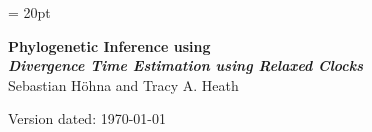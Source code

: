 \documentclass[11pt]{article}
\begin{document}
\renewcommand{\headrulewidth}{0.5pt}
\headsep = 20pt
\lhead{ }
\thispagestyle{plain}
\begin{center}

\textbf{\LARGE Phylogenetic Inference using \RevBayes}\\\vspace{2mm}
\textbf{\it{\Large Divergence Time Estimation using Relaxed Clocks}}\\\vspace{2mm}
\vspace{1cm}
{\Large Sebastian H{\"o}hna and Tracy A. Heath}
\vspace{1cm}


\end{center}

\def \ResourcePath {./}
\def \GlobalResourcePath {../}



Version dated: \today
\end{document}
